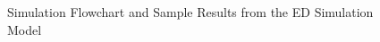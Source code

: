 \documentclass[12pt]{article}
\begin{document}
\begin{figure}[H]
    \centering
    \caption{Simulation Flowchart and Sample Results from the ED Simulation Model}
    \label{fig:results}
\end{figure}
\end{document}
